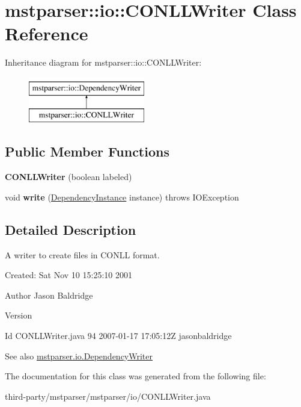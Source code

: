 \hypertarget{classmstparser_1_1io_1_1CONLLWriter}{
\section{mstparser::io::CONLLWriter Class Reference}
\label{classmstparser_1_1io_1_1CONLLWriter}
}
Inheritance diagram for mstparser::io::CONLLWriter:\begin{figure}[H]
\begin{center}
\leavevmode
\includegraphics[height=2cm]{classmstparser_1_1io_1_1CONLLWriter}
\end{center}
\end{figure}
\subsection*{Public Member Functions}
\begin{DoxyCompactItemize}
\item 
\hypertarget{classmstparser_1_1io_1_1CONLLWriter_a3f3c32c9cc37a5bd28b087091d4cee5c}{
{\bfseries CONLLWriter} (boolean labeled)}
\label{classmstparser_1_1io_1_1CONLLWriter_a3f3c32c9cc37a5bd28b087091d4cee5c}

\item 
\hypertarget{classmstparser_1_1io_1_1CONLLWriter_ac05c57ec9be16e0e6a8c718a3dc9e9ca}{
void {\bfseries write} (\hyperlink{classmstparser_1_1DependencyInstance}{DependencyInstance} instance)  throws IOException }
\label{classmstparser_1_1io_1_1CONLLWriter_ac05c57ec9be16e0e6a8c718a3dc9e9ca}

\end{DoxyCompactItemize}


\subsection{Detailed Description}
A writer to create files in CONLL format.

Created: Sat Nov 10 15:25:10 2001 

\begin{DoxyAuthor}{Author}
Jason Baldridge 
\end{DoxyAuthor}
\begin{DoxyVersion}{Version}

\end{DoxyVersion}
\begin{DoxyParagraph}{Id}
CONLLWriter.java 94 2007-\/01-\/17 17:05:12Z jasonbaldridge 
\end{DoxyParagraph}
\begin{DoxySeeAlso}{See also}
\hyperlink{classmstparser_1_1io_1_1DependencyWriter}{mstparser.io.DependencyWriter} 
\end{DoxySeeAlso}


The documentation for this class was generated from the following file:\begin{DoxyCompactItemize}
\item 
third-\/party/mstparser/mstparser/io/CONLLWriter.java\end{DoxyCompactItemize}
